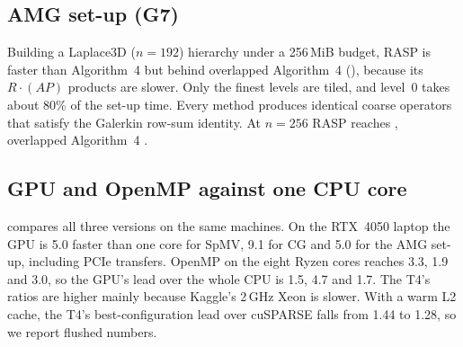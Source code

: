 \subsection{AMG set-up (G7)}\label{sec:res-amg}
Building a Laplace3D ($n=192$) hierarchy under a 256\,MiB budget, RASP is \x{} faster than
Algorithm~4 but behind overlapped Algorithm~4 (\x), because its $R\cdot(AP)$
products are slower. Only the finest levels are tiled, and level~0 takes about 80\% of the set-up time. Every method
produces identical coarse operators that satisfy the Galerkin row-sum identity. At $n=256$ RASP reaches
\x, overlapped Algorithm~4 \x.

\subsection{GPU and OpenMP against one CPU core}\label{sec:res-seq}
 compares all three versions on the same machines. On the RTX~4050 laptop the GPU is
5.0\x{} faster than one core for SpMV, 9.1\x{} for CG and 5.0\x{} for the AMG set-up, including PCIe transfers. OpenMP
on the eight Ryzen cores reaches 3.3\x, 1.9\x{} and 3.0\x, so the GPU's lead over the whole CPU is 1.5\x, 4.7\x{} and
1.7\x. The T4's ratios are higher mainly because Kaggle's 2\,GHz Xeon is slower. With a warm L2 cache, the T4's
best-configuration lead over cuSPARSE falls from 1.44\x{} to 1.28\x, so we report flushed numbers.

\begin{table}[t]
\centering\small
\caption{Speedup over one core of the same CPU (\texttt{results/*/comparison.txt}). OpenMP: best thread count.
SpMV: cuSPARSE, geometric mean over six matrices, fp64, L2 flushed. CG: Laplace $128^3$. AMG: set-up at $n=160$, in
core, GPU including transfers.}\label{tab:same-machine}
\end{table}

